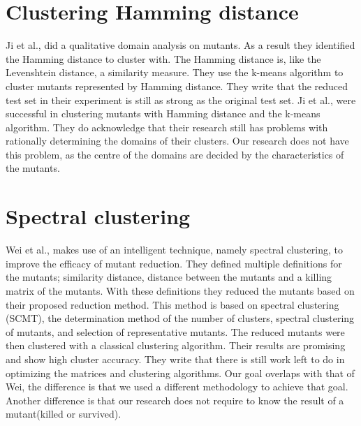 \documentclass[../main]{subfiles}
\begin{document}
\section{Clustering Hamming distance}
Ji et al., did a qualitative domain analysis on mutants\cite{Ji2009}.
As a result they identified the Hamming distance to cluster with. 
The Hamming distance is, like the Levenshtein distance, a similarity measure.
They use the k-means algorithm to cluster mutants represented by Hamming distance.
They write that the reduced test set in their experiment is still as strong as the original test set\cite{Ji2009}.
\newline
Ji et al., were successful in clustering mutants with Hamming distance and the k-means algorithm.
They do acknowledge that their research still has problems with rationally determining the domains of their clusters.
Our research does not have this problem, as the centre of the domains are decided by the characteristics of the mutants.

\section{Spectral clustering}
Wei et al., makes use of an intelligent technique, namely spectral clustering, to improve the efficacy of mutant reduction\cite{Wei2021SpectralTesting}.
They defined multiple definitions for the mutants; similarity distance, distance between the mutants and a killing matrix of the mutants.
With these definitions they reduced the mutants based on their proposed reduction method.
This method is based on spectral clustering (SCMT), the determination method of the number of clusters, spectral clustering of mutants, and selection of representative mutants.
The reduced mutants were then clustered with a classical clustering algorithm.
Their results are promising and show high cluster accuracy.
They write that there is still work left to do in optimizing the matrices and clustering algorithms.
Our goal overlaps with that of Wei, the difference is that we used a different methodology to achieve that goal.
Another difference is that our research does not require to know the result of a mutant(killed or survived).
\end{document}
